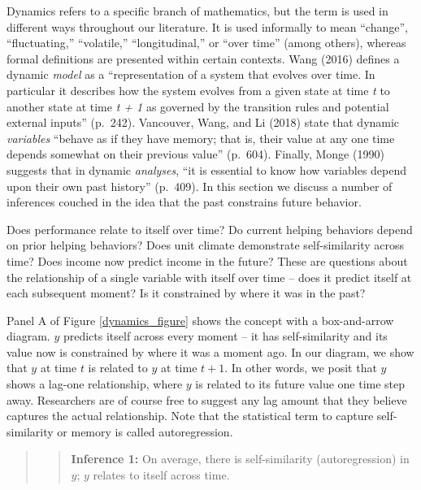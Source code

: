 \documentclass[english,,man]{apa6}
\begin{document}
Dynamics refers to a specific branch of mathematics, but the term is used in different ways throughout our literature. It is used informally to mean \enquote{change}, \enquote{fluctuating,} \enquote{volatile,} \enquote{longitudinal,} or \enquote{over time} (among others), whereas formal definitions are presented within certain contexts. Wang (2016) defines a dynamic \emph{model} as a \enquote{representation of a system that evolves over time. In particular it describes how the system evolves from a given state at time \emph{t} to another state at time \emph{t + 1} as governed by the transition rules and potential external inputs} (p.~242). Vancouver, Wang, and Li (2018) state that dynamic \emph{variables} \enquote{behave as if they have memory; that is, their value at any one time depends somewhat on their previous value} (p.~604). Finally, Monge (1990) suggests that in dynamic \emph{analyses}, \enquote{it is essential to know how variables depend upon their own past history} (p.~409). In this section we discuss a number of inferences couched in the idea that the past constrains future behavior.

Does performance relate to itself over time? Do current helping behaviors depend on prior helping behaviors? Does unit climate demonstrate self-similarity across time? Does income now predict income in the future? These are questions about the relationship of a single variable with itself over time -- does it predict itself at each subsequent moment? Is it constrained by where it was in the past?

Panel A of Figure \ref{dynamics_figure} shows the concept with a box-and-arrow diagram. \(y\) predicts itself across every moment -- it has self-similarity and its value now is constrained by where it was a moment ago. In our diagram, we show that \(y\) at time \(t\) is related to \(y\) at time \(t + 1\). In other words, we posit that \(y\) shows a lag-one relationship, where \(y\) is related to its future value one time step away. Researchers are of course free to suggest any lag amount that they believe captures the actual relationship. Note that the statistical term to capture self-similarity or memory is called autoregression.

\begin{quote}
\begin{quote}
\textbf{Inference 1:} On average, there is self-similarity (autoregression) in \(y\); \(y\) relates to itself across time.
\end{quote}
\end{quote}
\end{document}
